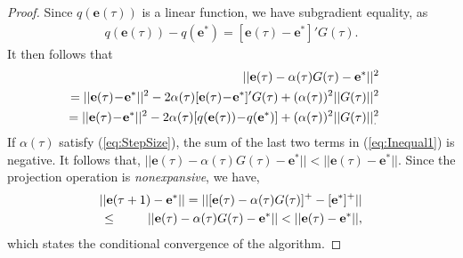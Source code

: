 \documentclass[12pt,onecolumn,draftclsnofoot]{IEEEtran} %
\begin{document}
\begin{proof}
Since $q(\mathbf{e}(\tau))$ is a linear function, we have subgradient equality, as
\begin{eqnarray}\label{eq:SubGradIneq}
  q(\mathbf{e}(\tau))-q(\mathbf{e}^{\ast})= \left[ \mathbf{e}(\tau)-\mathbf{e}^{\ast} \right]'G(\tau). \nonumber
\end{eqnarray}
It then follows that
\begin{eqnarray}
	 && \hspace{-0.3in}	||\mathbf{e}(\tau)-\alpha(\tau)G(\tau)-\mathbf{e}^{\ast}||^2
\nonumber \\
 && \hspace{-0.3in} = ||\mathbf{e}(\tau) \hspace{-0.025in} - \hspace{-0.025in} \mathbf{e}^{\ast}||^2 - 2 \alpha(\tau) 
		     [ \mathbf{e}(\tau) \hspace{-0.025in} - \hspace{-0.025in} \mathbf{e}^{\ast} ]' G(\tau) 
		+ (\alpha(\tau))^2||G(\tau)||^2  \nonumber \\
		&& \hspace{-0.3in} = ||\mathbf{e}(\tau) \hspace{-0.025in} - \hspace{-0.025in} 
		    \mathbf{e}^{\ast}||^2-2\alpha(\tau) 
		    [ q(\mathbf{e}(\tau)) \hspace{-0.025in} - \hspace{-0.025in} q(\mathbf{e}^{\ast}) ] 
		+(\alpha(\tau))^2||G(\tau)||^2_{.} \nonumber \\ \label{eq:Inequal1}  
\end{eqnarray}
If $\alpha(\tau)$ satisfy (\ref{eq:StepSize}), the sum of the last two terms in (\ref{eq:Inequal1}) is negative. It follows that,
  $||\mathbf{e}(\tau)-\alpha(\tau)G(\tau)-\mathbf{e}^{\ast}|| 
  < ||\mathbf{e}(\tau)-\mathbf{e}^{\ast}||$. 
Since the projection operation is {\em nonexpansive}, we have,
\begin{eqnarray}\label{eq:Inequal3}
	&& \hspace{-0.3in} ||\mathbf{e}(\tau+1)-\mathbf{e}^{\ast}|| =  
||[\mathbf{e}(\tau)-\alpha(\tau)G(\tau)]^+-[\mathbf{e}^{\ast}]^+|| 
	  \nonumber \\
	  &\le&
	  ||\mathbf{e}(\tau)-\alpha(\tau)G(\tau)-\mathbf{e}^{\ast}||
	  < ||\mathbf{e}(\tau)-\mathbf{e}^{\ast}||, \nonumber
\end{eqnarray}
which states the conditional convergence of the algorithm. 
\end{proof}
\end{document}
